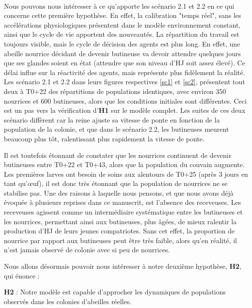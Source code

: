 		\paragraph{}
		Nous pouvons nous intéresser à ce qu'apporte les scénario 2.1 et 2.2 en ce qui concerne cette première hypothèse. En effet, la calibration "temps réel", sans les accélérations physiologiques présentent dans le modèle environnement constant, ainsi que le cycle de vie apportent des nouveautés. La répartition du travail est toujours visible, mais le cycle de décision des agents est plus long. En effet, une abeille nourrice décidant de devenir butineuse va devoir attendre quelques jours que ses glandes soient en état (attendre que son niveau d'HJ soit assez élevé). Ce délai influe sur la réactivité des agents, mais représente plus fidèlement la réalité. Les scénario 2.1 et 2.2 dans leurs figures respectives \ref{sc1} et \ref{sc2}, présentent tout deux à T0+22 des répartitions de populations identiques, avec environ 350 nourrices et 600 butineuses, alors que les conditions initiales sont différentes. Ceci est un pas vers la vérification d'\textbf{H1} sur le modèle complet. Les suites de ces deux scénario diffèrent car la reine ajuste sa vitesse de ponte en fonction de la population de la colonie, et que dans le scénario 2.2, les butineuses meurent beaucoup plus tôt, ralentissant plus rapidement la vitesse de ponte.
		
		Il est toutefois étonnant de constater que les nourrices continuent de devenir butineuses entre T0+22 et T0+43, alors que la population du couvain augmente. Les premières larves ont besoin de soins aux alentours de T0+25 (après 3 jours en tant qu'œuf), il est donc très étonnant que la population de nourrices ne se stabilise pas. Une des raisons à laquelle nous pensons, et que nous avons déjà évoquée à plusieurs reprises dans ce manuscrit, est l'absence des receveuses. Les receveuses agissent comme un intermédiaire systématique entre les butineuses et les nourrices, permettant ainsi aux butineuses, plus âgées, de mieux ralentir la production d'HJ de leurs jeunes compatriotes. Sans cet effet, la proportion de nourrice par rapport aux butineuses peut être très faible, alors qu'en réalité, il n'est jamais observé de colonie avec si peu de nourrices.
		

		Nous allons désormais pouvoir nous intéresser à notre deuxième hypothèse, \textbf{H2}, qui énonce : 
		
		 \textbf{H2} : Notre modèle est capable d'approcher les dynamiques de populations observés dans les colonies d'abeilles réelles.
		 
